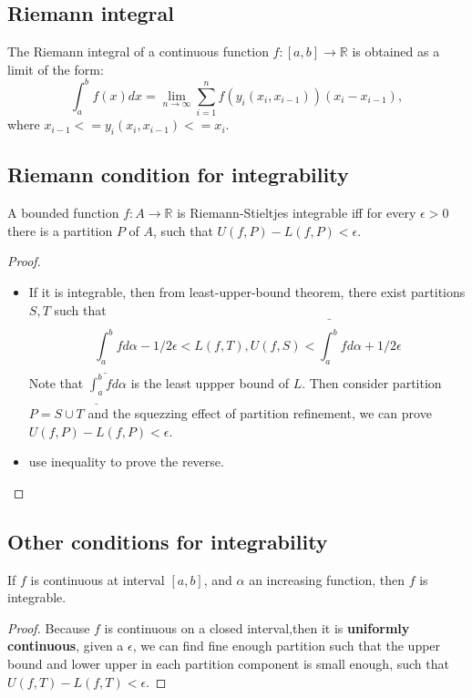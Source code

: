 \begin{refsection}
\subsection{Riemann integral}
\begin{definition}
The Riemann integral of a continuous function $f:[a,b] \rightarrow \mathbb{R}$ is obtained as a limit of the form:
$$\int_a^bf(x)dx = \lim_{n\rightarrow \infty} \sum_{i=1}^n f(y_i(x_i,x_{i-1}))(x_i-x_{i-1}),$$ where $x_{i-1}<=y_i(x_i,x_{i-1}) <=x_i.$	
\end{definition}

\subsection{Riemann condition for integrability}
\begin{theorem} A bounded function $f:A\rightarrow \mathbb{R}$ is Riemann-Stieltjes integrable iff for every $\epsilon >0$ there is a partition $P$ of $A$, such that $U(f,P)-L(f,P) < \epsilon$.\cite{johnsonbaugh2010foundations}
\end{theorem}
\begin{proof}
\begin{itemize}
	\item If it is integrable, then from least-upper-bound theorem, there exist partitions $S,T$ such that
	$$\underline{\int_a^b}f d\alpha -1/2\epsilon < L(f,T),U(f,S) < \bar{\int_a^b}f d\alpha + 1/2\epsilon$$
	Note that $\underline{\int_a^b}f d\alpha$ is the least uppper bound of $L$. Then consider partition $P=S\cup T$ and the squezzing effect of partition refinement, we can prove $U(f,P)-L(f,P) < \epsilon$.
	\item use inequality to prove the reverse. 
\end{itemize}	
\end{proof}


\subsection{Other conditions for integrability}
\begin{lemma}
If $f$ is continuous at interval $[a,b]$, and $\alpha$ an increasing function, then $f$ is integrable. \cite{johnsonbaugh2010foundations}
\end{lemma}
\begin{proof}
Because $f$ is continuous on a closed interval,then it is \textbf{uniformly continuous}, given a $\epsilon$, we can find fine enough partition such that the upper bound and lower upper in each partition component is small enough, such that $U(f,T)-L(f,T)<\epsilon$.	
\end{proof}



\end{refsection}
